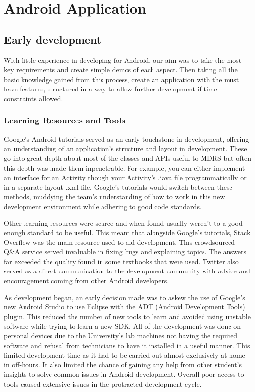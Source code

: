 \documentclass{l3proj}
\begin{document}

\section{Android Application}

\subsection{Early development} With little experience in developing for Android, our aim was to take the most key requirements and create simple demos of each aspect. Then taking all the basic knowledge gained from this process, create an application with the must have features, structured in a way to allow further development if time constraints allowed.

\subsubsection{Learning Resources and Tools} Google's Android tutorials served as an early touchstone in development, offering an understanding of an application's structure and layout in development. These go into great depth about most of the classes and APIs useful to MDRS but often this depth was made them inpenetrable. For example, you can either implement an interface for an Activity though your Activity's .java file programmatically or in a separate layout .xml file. Google's tutorials would switch between these methods, muddying the team's understanding of how to work in this new development environment while adhering to good code standards.

Other learning resources were scarce and when found usually weren't to a good enough standard to be useful. This meant that alongside Google's tutorials, Stack Overflow was the main resource used to aid development. This crowdsourced Q&A service served invaluable in fixing bugs and explaining topics. The answers far exceeded the quality found in some textbooks that were used. Twitter also served as a direct communication to the development community with advice and encouragement coming from other Android developers.

As development began, an early decision made was to askew the use of Google's new Android Studio to use Eclipse with the ADT (Android Development Tools) plugin. This reduced the number of new tools to learn and avoided using unstable software while trying to learn a new SDK. All of the development was done on personal devices due to the University's lab machines not having the required software and refusal from technicians to have it installed in a useful manner. This limited development time as it had to be carried out almost exclusively at home in off-hours. It also limited the chance of gaining any help from other student's insights to solve common issues in Android development. Overall poor access to tools caused extensive issues in the protracted  development cycle.
\end{document}
